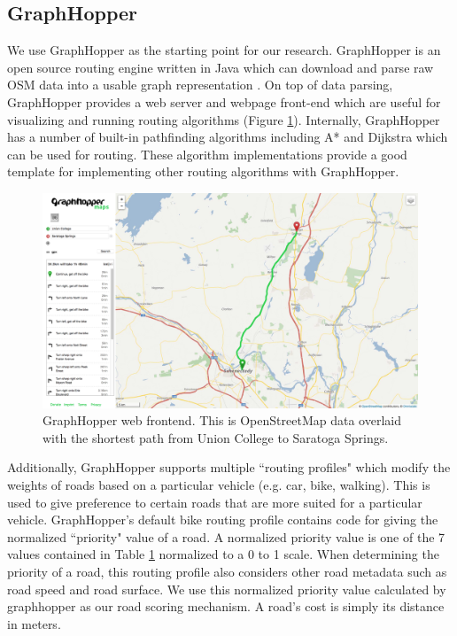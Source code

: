 \documentclass[11pt]{article}
\begin{document}
\subsection{GraphHopper}
\label{sec:graphhopper}
We use GraphHopper as the starting point for our research. GraphHopper is an open source routing engine written in Java which can download and parse raw OSM data into a usable graph representation \cite{graphhopper}. On top of data parsing, GraphHopper provides a web server and webpage front-end which are useful for visualizing and running routing algorithms (Figure \ref{tab:graphhopper-frontend}). Internally, GraphHopper has a number of built-in pathfinding algorithms including A* and Dijkstra which can be used for routing. These algorithm implementations provide a good template for implementing other routing algorithms with GraphHopper. 

\begin{figure}[h]
    \begin{center}
        \includegraphics[width=\textwidth]{figs/graphhopper}
    \end{center}
    \caption{GraphHopper web frontend. This is OpenStreetMap data overlaid with the shortest path from Union College to Saratoga Springs.}
    \label{tab:graphhopper-frontend}
\end{figure}

Additionally, GraphHopper supports multiple ``routing profiles" which modify the weights of roads based on a particular vehicle (e.g. car, bike, walking). This is used to give preference to certain roads that are more suited for a particular vehicle. GraphHopper's default bike routing profile contains code for giving the normalized ``priority" value of a road. A normalized priority value is one of the 7 values contained in Table \ref{tab:graphhopper-frontend} normalized to a 0 to 1 scale. When determining the priority of a road, this routing profile also considers other road metadata such as road speed and road surface. We use this normalized priority value calculated by graphhopper as our road scoring mechanism. A road's cost is simply its distance in meters.
\end{document}
